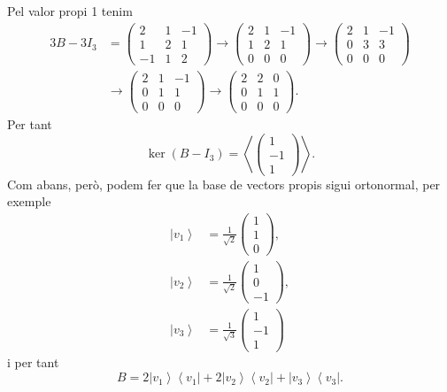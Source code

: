 \documentclass[12pt]{article}
\numberwithin{table}{section}
\numberwithin{figure}{section}
\numberwithin{equation}{section}
\newcommand{\ket}[1]{\left\lvert #1 \right\rangle}
\newcommand{\bra}[1]{\left\langle #1 \right\rvert}
\begin{document}
\begin{enumerate}[label=(\alph*), font=\bfseries \sffamily, wide, labelwidth=!, labelindent=0pt]
		Pel valor propi 1 tenim
		\begin{align*}
			3B - 3I_3 & = \begin{pmatrix}
				2 & 1 & -1 \\
				1 & 2 & 1 \\
				-1 & 1 & 2
			\end{pmatrix} \to 
			\begin{pmatrix}
				2&1&-1\\
				1&2&1\\
				0&0&0
			\end{pmatrix} \to
			\begin{pmatrix}
				2 & 1 & -1 \\
				0 & 3 & 3 \\
				0 & 0 & 0
			\end{pmatrix} \\
			& \to
			\begin{pmatrix}
				2 & 1 & -1 \\
				0 & 1 & 1 \\
				0 & 0 & 0
			\end{pmatrix} \to 
			\begin{pmatrix}
				2 & 2 & 0 \\
				0 & 1 & 1 \\
				0 & 0 & 0
			\end{pmatrix} .
		\end{align*}
		Per tant 
		\begin{equation*}
			\ker{(B - I_3)} = \left\langle \begin{pmatrix}
					1\\-1\\1
			\end{pmatrix} \right\rangle.
		\end{equation*}
		Com abans, però, podem fer que la base de vectors propis sigui ortonormal, per exemple
		\begin{align*}
			\ket{v_1} & = \frac{1}{\sqrt{2}}\begin{pmatrix}
				1\\1\\0
			\end{pmatrix}, \\
			\ket{v_2} & = \frac{1}{\sqrt{2}}\begin{pmatrix}
				1\\0\\-1
			\end{pmatrix}, \\
			\ket{v_3} & = \frac{1}{\sqrt{3}}\begin{pmatrix}
				1\\-1\\1
			\end{pmatrix}
		\end{align*}
		i per tant
		\begin{equation*}
			B = 2\ket{v_1}\bra{v_1} + 2\ket{v_2}\bra{v_2} + \ket{v_3}\bra{v_3}.
		\end{equation*}


\end{enumerate}
\end{document}
